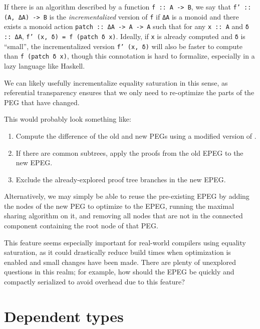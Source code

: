\documentclass[11pt]{report}
\newcommand{\haskell}[1]{\texttt{#1}}
\begin{document}
If there is an algorithm described by a function \haskell{f :: A -> B}, we say
that \haskell{f' :: (A, ΔA) -> B} is the \textit{incrementalized} version of
\haskell{f} if \haskell{ΔA} is a monoid and there exists a monoid action
\haskell{patch :: ΔA -> A -> A} such that for any \haskell{x :: A} and
\haskell{δ :: ΔA},
\texttt{\haskell{f'} (\haskell{x}, \haskell{δ}) = \haskell{f} (\haskell{patch} \haskell{δ} \haskell{x})}.
Ideally, if \haskell{x} is already computed and \haskell{δ} is ``small'', the
incrementalized version \texttt{\haskell{f'} (\haskell{x}, \haskell{δ})} will
also be faster to compute than
\texttt{\haskell{f} (\haskell{patch} \haskell{δ} \haskell{x})},
though this connotation is hard to formalize, especially in a
lazy language like Haskell.

We can likely usefully incrementalize equality saturation in this sense, as
referential transparency ensures that we only need to re-optimize the parts of
the PEG that have changed.

This would probably look something like:

\begin{enumerate}
\item {%
  Compute the difference of the old and new PEGs using
  a modified version of \cite{lempsink-2009}.
}
\item {%
  If there are common subtrees, apply the proofs from the old EPEG
  to the new EPEG.
}
\item {%
  Exclude the already-explored proof tree branches in the new EPEG.
}
\end{enumerate}

Alternatively, we may simply be able to reuse the pre-existing EPEG by adding
the nodes of the new PEG to optimize to the EPEG, running the maximal sharing
algorithm on it, and removing all nodes that are not in the connected component
containing the root node of that PEG.

This feature seems especially important for real-world compilers using equality
saturation, as it could drastically reduce build times when optimization is
enabled and small changes have been made. There are plenty of unexplored
questions in this realm; for example, how should the EPEG be quickly and
compactly serialized to avoid overhead due to this feature?

\section{Dependent types}
\label{sec:dependent-types}
\end{document}
